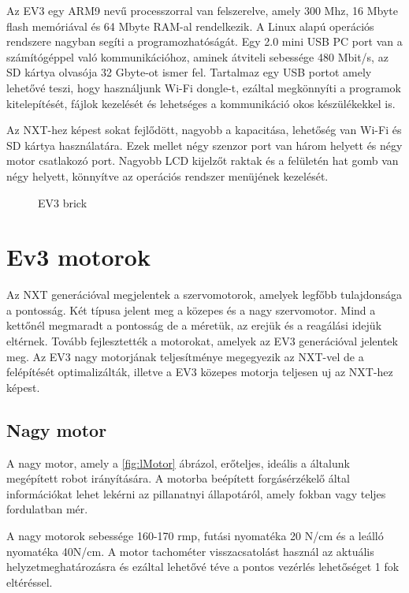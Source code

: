 Az EV3 egy ARM9 nevű processzorral van felszerelve, amely 300 Mhz, 16 Mbyte flash memóriával és 64 Mbyte RAM-al rendelkezik. A Linux alapú operációs rendszere nagyban segíti a programozhatóságát. Egy 2.0 mini USB PC port van a számítógéppel való kommunikációhoz, aminek átviteli sebessége 480 Mbit/s, az SD kártya olvasója 32 Gbyte-ot ismer fel. Tartalmaz egy USB portot amely lehetővé teszi, hogy használjunk Wi-Fi dongle-t, ezáltal megkönnyíti a programok kitelepítését, fájlok kezelését és lehetséges a kommunikáció okos készülékekkel is.

Az NXT-hez képest sokat fejlődött, nagyobb a kapacitása, lehetőség van Wi-Fi és SD kártya használatára. Ezek mellet négy szenzor port van három helyett és négy motor csatlakozó port. Nagyobb LCD kijelzőt raktak és a felületén hat gomb van négy helyett, könnyítve az operációs rendszer menüjének kezelését.

\begin{figure}[!htb]
	\label{fig:EV3}
	\centering
	\caption{EV3 brick}
\end{figure}


\section{Ev3 motorok}\label{sec:ROBOT:motorok}
Az NXT generációval megjelentek a szervomotorok, amelyek legfőbb tulajdonsága a pontosság. Két típusa jelent meg a közepes és a nagy szervomotor. Mind a kettőnél megmaradt a pontosság de a méretük, az erejük és a reagálási idejük eltérnek. Tovább fejlesztették a motorokat, amelyek az EV3 generációval jelentek meg. Az EV3 nagy motorjának teljesítménye megegyezik az NXT-vel de a felépítését optimalizálták, illetve a EV3 közepes motorja teljesen uj az NXT-hez képest.

\subsection{Nagy motor}
A nagy motor, amely a \ref{fig:lMotor} ábrázol, erőteljes, ideális a általunk megépített robot irányítására. A motorba beépített forgásérzékelő által  információkat lehet lekérni az pillanatnyi állapotáról, amely fokban vagy teljes fordulatban mér.

A nagy motorok sebessége 160-170 rmp, futási nyomatéka 20 N/cm és a leálló nyomatéka 40N/cm. A motor tachométer visszacsatolást használ az aktuális helyzetmeghatározásra és ezáltal lehetővé téve a pontos vezérlés lehetőséget 1 fok eltéréssel.

